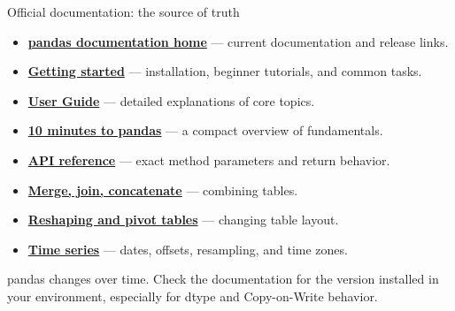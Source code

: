 \documentclass[aspectratio=169,10pt]{beamer}
\begin{document}
\begin{frame}[fragile]{Official documentation: the source of truth}
\begin{itemize}
\item \href{https://pandas.pydata.org/docs/}{\textbf{pandas documentation home}} — current documentation and release links.
\item \href{https://pandas.pydata.org/docs/getting_started/}{\textbf{Getting started}} — installation, beginner tutorials, and common tasks.
\item \href{https://pandas.pydata.org/docs/user_guide/}{\textbf{User Guide}} — detailed explanations of core topics.
\item \href{https://pandas.pydata.org/docs/user_guide/10min.html}{\textbf{10 minutes to pandas}} — a compact overview of fundamentals.
\item \href{https://pandas.pydata.org/docs/reference/index.html}{\textbf{API reference}} — exact method parameters and return behavior.
\item \href{https://pandas.pydata.org/docs/user_guide/merging.html}{\textbf{Merge, join, concatenate}} — combining tables.
\item \href{https://pandas.pydata.org/docs/user_guide/reshaping.html}{\textbf{Reshaping and pivot tables}} — changing table layout.
\item \href{https://pandas.pydata.org/docs/user_guide/timeseries.html}{\textbf{Time series}} — dates, offsets, resampling, and time zones.
\end{itemize}
\small pandas changes over time. Check the documentation for the version installed in your environment, especially for dtype and Copy-on-Write behavior.
\end{frame}
\end{document}
